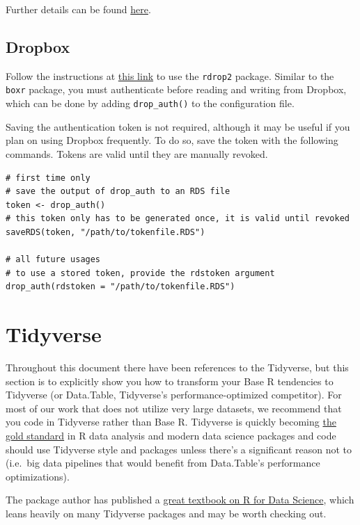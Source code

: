 \documentclass[
]{book}
\begin{document}
Further details can be found \href{https://github.com/r-box/boxr}{here}.

\subsection{Dropbox}\label{dropbox}

Follow the instructions at \href{https://github.com/karthik/rdrop2}{this link} to use the \texttt{rdrop2} package. Similar to the \texttt{boxr} package, you must authenticate before reading and writing from Dropbox, which can be done by adding \texttt{drop\_auth()} to the configuration file.

Saving the authentication token is not required, although it may be useful if you plan on using Dropbox frequently. To do so, save the token with the following commands. Tokens are valid until they are manually revoked.

\begin{verbatim}
# first time only
# save the output of drop_auth to an RDS file
token <- drop_auth()
# this token only has to be generated once, it is valid until revoked
saveRDS(token, "/path/to/tokenfile.RDS")

# all future usages
# to use a stored token, provide the rdstoken argument
drop_auth(rdstoken = "/path/to/tokenfile.RDS")
\end{verbatim}

\section{Tidyverse}\label{tidyverse}

Throughout this document there have been references to the Tidyverse, but this section is to explicitly show you how to transform your Base R tendencies to Tidyverse (or Data.Table, Tidyverse's performance-optimized competitor). For most of our work that does not utilize very large datasets, we recommend that you code in Tidyverse rather than Base R. Tidyverse is quickly becoming \href{https://rviews.rstudio.com/2017/06/08/what-is-the-tidyverse/}{the gold standard} in R data analysis and modern data science packages and code should use Tidyverse style and packages unless there's a significant reason not to (i.e.~big data pipelines that would benefit from Data.Table's performance optimizations).

The package author has published a \href{https://r4ds.had.co.nz/}{great textbook on R for Data Science}, which leans heavily on many Tidyverse packages and may be worth checking out.
\end{document}
